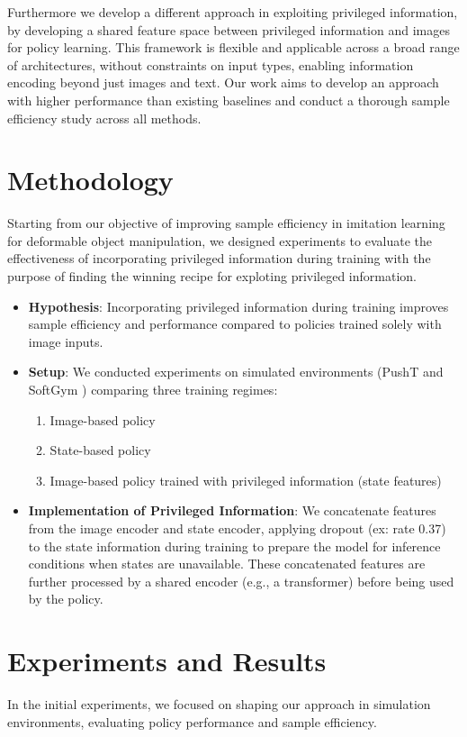 \documentclass{article}
\begin{document}
Furthermore we develop a different approach in exploiting privileged information, by developing a shared feature space between privileged information and images for policy learning.
This framework is flexible and applicable across a broad range of architectures, without constraints on input types,
enabling information encoding beyond just images and text. Our work aims to develop an approach with higher performance
than existing baselines and conduct a thorough sample efficiency study across all methods.

\section*{Methodology}
Starting from our objective of improving sample efficiency in imitation learning for deformable object manipulation,
we designed experiments to evaluate the effectiveness of incorporating privileged information during training with the purpose
of finding the winning recipe for exploting privileged information.

\begin{itemize}
    \item \textbf{Hypothesis}: Incorporating privileged information during training improves sample efficiency and performance compared to policies trained solely with image inputs.
    
    \item \textbf{Setup}: We conducted experiments on simulated environments (PushT and SoftGym \cite{lin2021softgym}) comparing three training regimes:
    \begin{enumerate}
        \item Image-based policy
        \item State-based policy
        \item Image-based policy trained with privileged information (state features)
    \end{enumerate}
    
    \item \textbf{Implementation of Privileged Information}: We concatenate features from the image encoder and state encoder, applying dropout (ex: rate 0.37) to the state information during training to prepare the model for inference conditions when states are unavailable. These concatenated features are further processed by a shared encoder (e.g., a transformer) before being used by the policy.
\end{itemize}

\section*{Experiments and Results}
In the initial experiments, we focused on shaping our approach in simulation environments, evaluating policy performance and sample efficiency.
\end{document}
